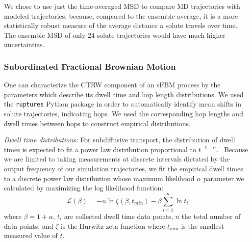 \documentclass[journal=ancac3,manuscript=article,layout=twocolumn]{achemso}
\begin{document}
  We chose to use just the time-averaged MSD to compare MD trajectories with
  modeled trajectories, because, compared to the ensemble average, it is a more
  statistically robust measure of the average distance a solute travels over
  time. The ensemble MSD of only 24 solute trajectories would have much higher
  uncertainties.
  
  \subsubsection{Subordinated Fractional Brownian Motion}\label{method:sfbm}

  One can characterize the CTRW component of an sFBM process by the parameters
  which describe its dwell time and hop length distributions. We used the
  \texttt{ruptures} Python package in order to automatically identify mean
  shifts in solute trajectories, indicating hops.\cite{truong_ruptures:_2018}
  We used the corresponding hop lengths and dwell times between hops to
  construct empirical distributions.
  
  \textit{Dwell time distributions:} For subdiffusive transport, the distribution 
  of dwell times is expected to fit a power law distribution 
  proportional to $t^{-1-\alpha}$.~\cite{meroz_toolbox_2015}
  Because we are limited to taking measurements at discrete intervals dictated by the output 
  frequency of our simulation trajectories, we fit the empirical dwell times
  to a discrete power law distribution whose maximum likelihood $\alpha$ 
  parameter we calculated by maximizing the log likelihood function: 
  \begin{equation}
	\mathcal{L}(\beta) = -n\ln \zeta(\beta, t_{min}) -
	\beta\sum_{i=1}^{n} \ln t_i 
  \label{eqn:powerlaw_likelihood}
  \end{equation}
  where $\beta = 1 + \alpha$, $t_i$ are collected dwell time data points,
  $n$ the total number of data points, and $\zeta$ is the Hurwitz zeta function
  where $t_{min}$ is the smallest measured value of $t$.~\cite{clauset_power-law_2009}
  
\end{document}
